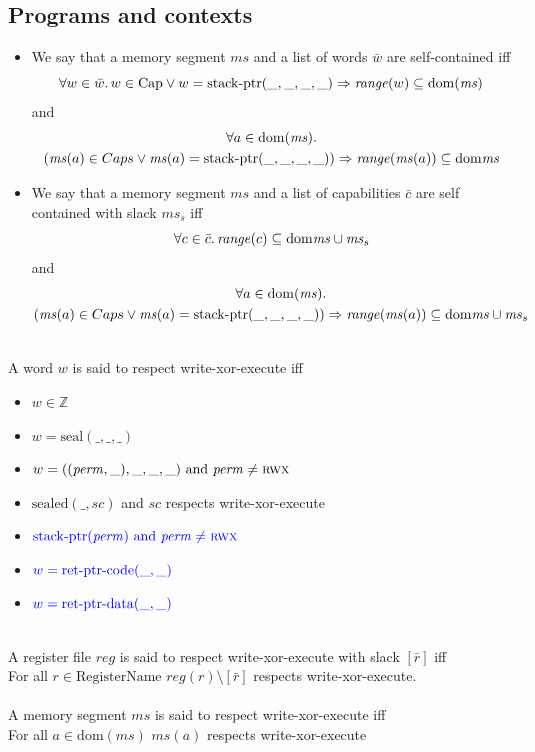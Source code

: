 \documentclass[a3paper]{article}
\newcommand{\dom}{\mathrm{dom}}
\newcommand{\tand}{\text{ and }}
\newcommand{\sourcecolor}{\color{blue}}
\newcommand{\src}[1]{{\sourcecolor #1}}
\newcommand{\ints}{\mathbb{Z}}
\newcommand{\shareddom}[1]{\mathrm{#1}}
\newcommand{\RegName}{\shareddom{RegisterName}}
\newcommand{\Caps}{\shareddom{Cap}}
\newcommand{\perm}{\var{perm}}
\newcommand{\stkptr}[1]{\mathrm{stack\text{-}ptr}(#1)}
\newcommand{\retptrd}{\mathrm{ret\text{-}ptr\text{-}data}}
\newcommand{\retptrc}{\mathrm{ret\text{-}ptr\text{-}code}}
\newcommand{\seal}[1]{\shareddom{seal}(#1)}
\newcommand{\sealed}[1]{\shareddom{sealed}(#1)}
\newcommand{\var}[1]{\mathit{#1}}
\newcommand{\reg}{\var{reg}}
\newcommand{\ms}{\var{ms}}
\newcommand{\vsc}{\var{sc}}
\newcommand{\aaddr}{\var{a}}
\newcommand{\plainperm}[1]{\textsc{#1}}
\newcommand{\rwx}{\plainperm{rwx}}
\newcommand{\plainfun}[2]{
  \ifthenelse{\equal{#2}{}}
  {\mathit{#1}}
  {\mathit{#1}(#2)}
}
\newcommand{\range}[1]{\plainfun{range}{#1}}
\begin{document}
\subsection{Programs and contexts}
\begin{definition}
  \label{def:self-contained}
  \begin{itemize}
  \item We say that a memory segment $\ms$ and a list of words $\bar{w}$
    are self-contained iff
  \[
    \forall w \in \bar{w} \ldotp w \in \Caps \lor w = \stkptr{\_,\_,\_,\_} \Rightarrow \range{w} \subseteq \dom(\ms)
  \]
  and
  \begin{multline*}
    \forall a \in \dom(\ms) \ldotp\\
    (\ms(a) \in Caps \lor \ms(a) = \stkptr{\_,\_,\_,\_}) \Rightarrow \range{\ms(a)} \subseteq \dom{\ms}
  \end{multline*}
  \item We say that a memory segment $\ms$ and a list of capabilities $\bar{c}$ are self contained with slack $\ms_s$ iff
  \[
    \forall c \in \bar{c} \ldotp \range{c} \subseteq \dom{\ms \cup \ms_s}
  \]
  and
  \begin{multline*}
    \forall a \in \dom(\ms) \ldotp\\
    (\ms(a) \in Caps \lor \ms(a) = \stkptr{\_,\_,\_,\_}) \Rightarrow \range{\ms(a)} \subseteq \dom{\ms \cup \ms_s}
  \end{multline*}
\end{itemize}
\end{definition}

\begin{definition}
  \label{def:wxorx}
  ~\\
  A word $w$ is said to respect write-xor-execute iff
  \begin{itemize}
  \item $w \in \ints$
  \item $w = \seal{\_,\_,\_}$
  \item $w = ((\perm,\_),\_,\_,\_) \tand \perm \neq \rwx$
  \item $\sealed{\_,\vsc}$ and $\vsc$ respects write-xor-execute
  \item $\src{\stkptr{\perm} \tand \perm \neq \rwx}$
  \item $\src{w = \retptrc(\_,\_)}$
  \item $\src{w = \retptrd(\_,\_)}$
  \end{itemize}
~\\
  A register file $\reg$ is said to respect write-xor-execute with slack $[\bar{r}]$ iff \\
  For all $r \in \RegName$ $\reg(r) \setminus [\bar{r}]$ respects write-xor-execute.
~\\
~\\
  A memory segment $\ms$ is said to respect write-xor-execute iff\\
  For all $\aaddr \in \dom(\ms)$ $\ms(\aaddr)$ respects write-xor-execute
\end{definition}
\end{document}

